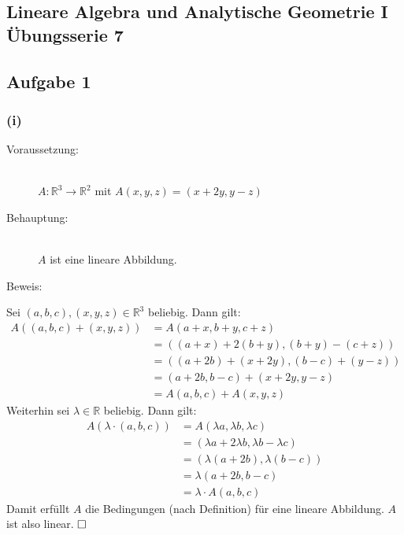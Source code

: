 \documentclass[10pt, a4paper]{article}
\begin{document}
	
	\begin{center}
		\section*{Lineare Algebra und Analytische Geometrie I\\ Übungsserie 7} %
		\label{sec:lineare_algebra_und_analytische_geometrie_i}
		
	\end{center}

	\subsection*{Aufgabe 1} %
	\label{sub:aufgabe_1}
	
		\subsubsection*{(i)} %
		\label{ssub:i}
			
			\begin{description}
				\item[Voraussetzung:] \hfill \\
					$A:\mathbb{R}^3\longrightarrow\mathbb{R}^2$ mit $A(x,y,z) = (x+2y , y-z)$
				\item[Behauptung:] \hfill \\
					$A$ ist eine lineare Abbildung.
				\item[Beweis:]
			\end{description}
			
			Sei $(a,b,c),(x,y,z) \in \mathbb{R}^3$ beliebig. Dann gilt:
			\begin{align*}
				A((a,b,c)+(x,y,z)) &= A(a+x,b+y,c+z)\\
				&= \left((a+x) + 2(b+y), (b+y) - (c+z) \right)\\
				&= ((a+2b) + (x+2y), (b-c) + (y-z))\\
				&= (a+2b, b-c) + (x+2y,y-z)\\
				&= A(a,b,c) + A(x,y,z)
			\end{align*}
			Weiterhin sei $\lambda \in \mathbb{R}$ beliebig. Dann gilt:
			\begin{align*}
				A(\lambda \cdot (a,b,c)) &= A(\lambda a, \lambda b, \lambda c)\\
				&= (\lambda a + 2\lambda b, \lambda b - \lambda c) \\
				&= (\lambda(a+2b), \lambda(b-c)) \\
				&= \lambda (a+2b, b-c)\\
				&= \lambda\cdot A(a,b,c)
			\end{align*}
			Damit erfüllt $A$ die Bedingungen (nach Definition) für eine lineare Abbildung. $A$ ist also linear. $\hfill\Box$
\end{document}

